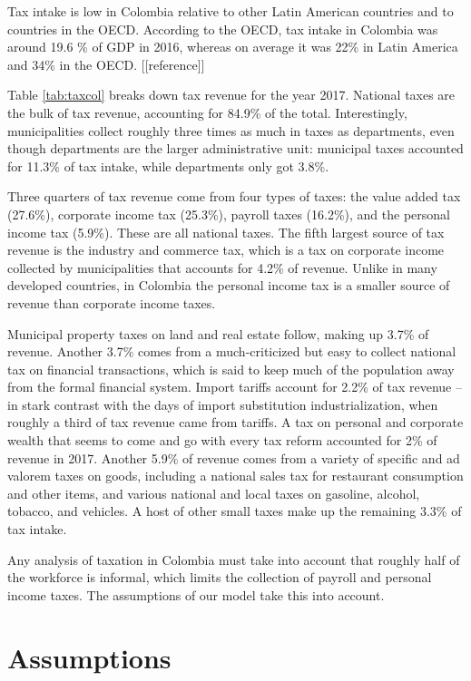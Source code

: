 \documentclass[12pt]{article}
\begin{document}
Tax intake is low in Colombia relative to other Latin American countries and to countries in the OECD.
According to the OECD, tax intake in Colombia was around 19.6 \% of GDP in 2016,
whereas on average it was 22\% in Latin America and 34\% in the OECD. [[reference]]

Table \ref{tab:taxcol} breaks down tax revenue for the year 2017.
National taxes are the bulk of tax revenue,
accounting for 84.9\% of the total.
Interestingly, municipalities collect roughly three times as much in taxes as departments,
even though departments are the larger administrative unit:
municipal taxes accounted for 11.3\% of tax intake,
while departments only got 3.8\%.

Three quarters of tax revenue come from four types of taxes:
the value added tax (27.6\%),
corporate income tax (25.3\%),
payroll taxes (16.2\%),
and the personal income tax (5.9\%).
These are all national taxes.
The fifth largest source of tax revenue is the industry and commerce tax,
which is a tax on corporate income collected by municipalities
that accounts for 4.2\% of revenue.
Unlike in many developed countries, in Colombia
the personal income tax is a smaller source of revenue than corporate income taxes.

Municipal property taxes on land and real estate follow,
making up 3.7\% of revenue.
Another 3.7\% comes from a much-criticized but easy to collect national tax on financial transactions,
which is said to keep much of the population away from the formal financial system.
Import tariffs account for 2.2\% of tax revenue
-- in stark contrast with the days of import substitution industrialization,
when roughly a third of tax revenue came from tariffs.
A tax on personal and corporate wealth
that seems to come and go with every tax reform
accounted for 2\% of revenue in 2017.
Another 5.9\% of revenue comes from a variety of specific and ad valorem taxes on goods,
including a national sales tax for restaurant consumption and other items,
and various national and local taxes on
gasoline, alcohol, tobacco, and vehicles.
A host of other small taxes make up the remaining 3.3\% of tax intake.

Any analysis of taxation in Colombia must take into account that
roughly half of the workforce is informal,
which limits the collection of payroll and personal income taxes.
The assumptions of our model take this into account.

\section{Assumptions}
\end{document}
